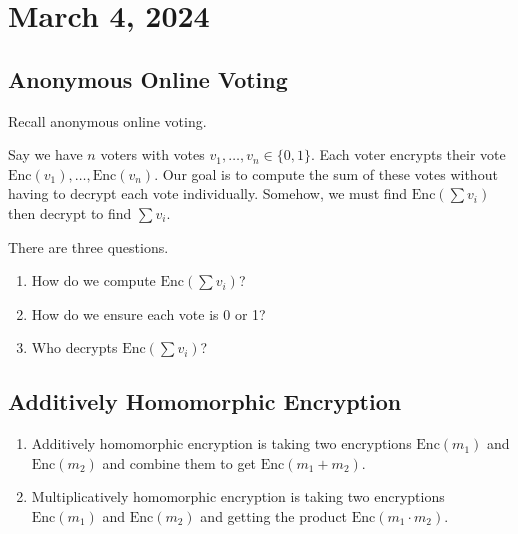 \section{March 4, 2024}
\label{20240304}

\subsection{Anonymous Online Voting}

Recall anonymous online voting.

Say we have $n$ voters with votes $v_1, \dots, v_n \in \{ 0, 1\}$. Each voter encrypts their vote $\text{Enc}(v_1), \dots, \text{Enc}(v_n)$. Our goal is to compute the sum of these votes without having to decrypt each vote individually. Somehow, we must find $\text{Enc}(\sum v_i)$ then decrypt to find $\sum v_i$.

There are three questions.
\begin{enumerate}
    \item How do we compute $\text{Enc}(\sum v_i)$?
    \item How do we ensure each vote is 0 or 1?
    \item Who decrypts $\text{Enc}(\sum v_i)$?
\end{enumerate}

\subsection{Additively Homomorphic Encryption}

\begin{enumerate}
    \item Additively homomorphic encryption is taking two encryptions $\text{Enc}(m_1)$ and $\text{Enc}(m_2)$ and combine them to get $\text{Enc}(m_1 + m_2)$.
    \item Multiplicatively homomorphic encryption is taking two encryptions $\text{Enc}(m_1)$ and $\text{Enc}(m_2)$ and getting the product $\text{Enc}(m_1 \cdot m_2)$.
\end{enumerate}

